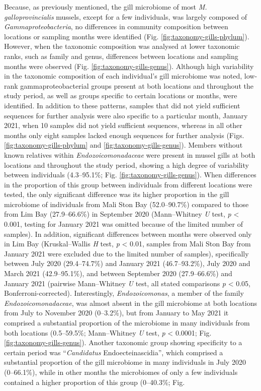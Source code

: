 \documentclass[
  12 pt,
]{article}
\begin{document}
Because, as previously mentioned, the gill microbiome of most \emph{M. galloprovincialis} mussels, except for a few individuals, was largely composed of \emph{Gammaproteobacteria}, no differences in community composition between locations or sampling months were identified (Fig. \ref{fig:taxonomy-gills-phylum}). However, when the taxonomic composition was analysed at lower taxonomic ranks, such as family and genus, differences between locations and sampling months were observed (Fig. \ref{fig:taxonomy-gills-genus}). Although high variability in the taxonomic composition of each individual's gill microbiome was noted, low-rank gammaproteobacterial groups present at both locations and throughout the study period, as well as groups specific to certain locations or months, were identified. In addition to these patterns, samples that did not yield sufficient sequences for further analysis were also specific to a particular month, January 2021, when 10 samples did not yield sufficient sequences, whereas in all other months only eight samples lacked enough sequences for further analysis (Figs. \ref{fig:taxonomy-gills-phylum} and \ref{fig:taxonomy-gills-genus}). Members without known relatives within \emph{Endozoicomonadaceae} were present in mussel gills at both locations and throughout the study period, showing a high degree of variability between individuals (4.3--95.1\unit{\percent}; Fig. \ref{fig:taxonomy-gills-genus}). When differences in the proportion of this group between individuals from different locations were tested, the only significant difference was its higher proportion in the gill microbiome of individuals from Mali Ston Bay (52.0--90.7\unit{\percent}) compared to those from Lim Bay (27.9--66.6\unit{\percent}) in September 2020 (Mann--Whitney \emph{U} test, \emph{p} \textless{} 0.001, testing for January 2021 was omitted because of the limited number of samples). In addition, significant differences between months were observed only in Lim Bay (Kruskal--Wallis \emph{H} test, \emph{p} \textless{} 0.01, samples from Mali Ston Bay from January 2021 were excluded due to the limited number of samples), specifically between July 2020 (29.4--74.7\unit{\percent}) and January 2021 (46.7--93.2\unit{\percent}), July 2020 and March 2021 (42.9--95.1\unit{\percent}), and between September 2020 (27.9--66.6\unit{\percent}) and January 2021 (pairwise Mann--Whitney \emph{U} test, all stated comparisons \emph{p} \textless{} 0.05, Bonferroni-corrected). Interestingly, \emph{Endozoicomonas}, a member of the family \emph{Endozoicomonadaceae}, was almost absent in the gill microbiome at both locations from July to November 2020 (0--3.2\unit{\percent}), but from January to May 2021 it comprised a substantial proportion of the microbiome in many individuals from both locations (0.5--59.5\unit{\percent}; Mann--Whitney \emph{U} test, \emph{p} \textless{} 0.0001; Fig. \ref{fig:taxonomy-gills-genus}). Another taxonomic group showing specificity to a certain period was ``\emph{Candidatus} Endoecteinascidia'', which comprised a substantial proportion of the gill microbiome in many individuals in July 2020 (0--66.1\unit{\percent}), while in other months the microbiomes of only a few individuals contained a higher proportion of this group (0--40.3\unit{\percent}; Fig. 
\end{document}
